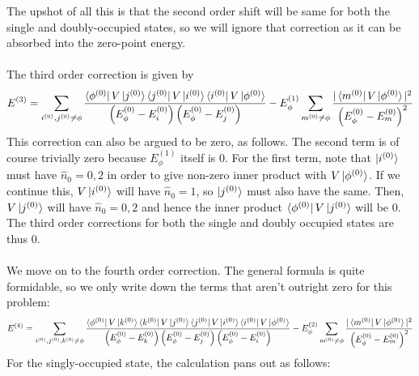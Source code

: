 \documentclass[twoside,11pt]{report}
\numberwithin{equation}{section}
\begin{document}
The upshot of all this is that the second order shift will be same for both the single and doubly-occupied states, so we will ignore that correction as it can be absorbed into the zero-point energy.
\\\\The third order correction is given by
\begin{equation}\begin{aligned}
	E^{(3)} = \sum_{i^{(0)}, j^{(0)}\neq\phi}\frac{\bra{\phi^{(0)}}V\ket{j^{(0)}}\bra{j^{(0)}}V\ket{i^{(0)}}\bra{i^{(0)}}V\ket{\phi^{(0)}}}{\left(E^{(0)}_\phi - E^{(0)}_i\right)\left(E^{(0)}_\phi - E^{(0)}_j\right)} - E_\phi^{(1)}\sum_{m^{(0)}\neq\phi}\frac{|\bra{m^{(0)}}V\ket{\phi^{(0)}}|^2}{\left(E^{(0)}_\phi - E^{(0)}_m\right)^2}
\end{aligned}\end{equation}
This correction can also be argued to be zero, as follows. The second term is of course trivially zero because \(E_\phi^{(1)}\) itself is 0. For the first term, note that \(\ket{i^{(0)}}\) must have \(\hat n_0 = 0,2\) in order to give non-zero inner product with \(V\ket{\phi^{(0)}}\). If we continue this, \(V\ket{i^{(0)}}\) will have \(\hat n_0 = 1\), so \(\ket{j^{(0)}}\) must also have the same. Then, \(V\ket{j^{(0)}}\) will have \(\hat n_0 = 0, 2\) and hence the inner product \(\bra{\phi^{(0)}}V\ket{j^{(0)}}\) will be 0. The third order corrections for both the single and doubly occupied states are thus 0.
\\\\We move on to the fourth order correction. The general formula is quite formidable, so we only write down the terms that aren't outright zero for this problem:
\begin{equation}\begin{aligned}
	E^{(4)} = \sum_{i^{(0)}, j^{(0)}, k^{(0)}\neq\phi}\frac{\bra{\phi^{(0)}}V\ket{k^{(0)}}\bra{k^{(0)}}V\ket{j^{(0)}}\bra{j^{(0)}}V\ket{i^{(0)}}\bra{i^{(0)}}V\ket{\phi^{(0)}}}{\left(E^{(0)}_\phi - E^{(0)}_k\right)\left(E^{(0)}_\phi - E^{(0)}_j\right)\left(E^{(0)}_\phi - E^{(0)}_i\right)} - E_\phi^{(2)}\sum_{m^{(0)}\neq\phi}\frac{|\bra{m^{(0)}}V\ket{\phi^{(0)}}|^2}{\left(E^{(0)}_\phi - E^{(0)}_m\right)^2}
\end{aligned}\end{equation}
For the singly-occupied state, the calculation pans out as follows:
\end{document}
